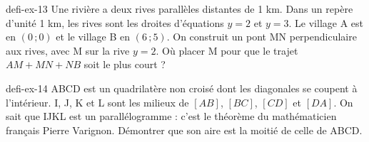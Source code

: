 \begin{blocEdition}{defi-ex-13}
Une rivière a deux rives parallèles distantes de 1 km. Dans un repère d’unité 1 km, les rives sont les droites d’équations $y=2$ et $y=3$. Le village A est en $(0\,;0)$ et le village B en $(6\,;5)$. On construit un pont MN perpendiculaire aux rives, avec M sur la rive $y=2$. Où placer M pour que le trajet $AM+MN+NB$ soit le plus court ?\label{fig-defi-13}
\par{}\par\par{}\par{}\par{}\par{}\par{}\par{}
\end{blocEdition}
\begin{blocEdition}{defi-ex-14}
ABCD est un quadrilatère non croisé dont les diagonales se coupent à l’intérieur. I, J, K et L sont les milieux de $[AB]$, $[BC]$, $[CD]$ et $[DA]$. On sait que IJKL est un parallélogramme : c’est le théorème du mathématicien français Pierre Varignon. Démontrer que son aire est la moitié de celle de ABCD.\label{fig-defi-14}
\par{}\par\par{}\par{}\par{}\par{}\par{}\par{}
\end{blocEdition}
